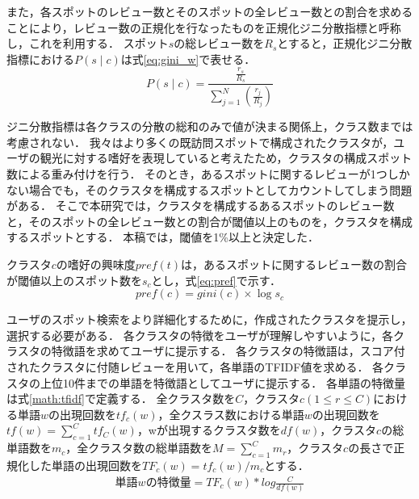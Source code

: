 \documentclass{deimj}
\begin{document}
また，各スポットのレビュー数とそのスポットの全レビュー数との割合を求めることにより，レビュー数の正規化を行なったものを正規化ジニ分散指標と呼称し，これを利用する．
スポット$s$の総レビュー数を$R_s$とすると，正規化ジニ分散指標における$P(s \mid c)$は式\ref{eq:gini_w}で表せる．
\begin{equation}
    P(s \mid c)=\frac {\frac{r_s}{R_s}}{\sum ^{N}_{j=1}\left( \frac {r_j}{R_j}\right)}
    \label{eq:gini_w}
\end{equation}

ジニ分散指標は各クラスの分散の総和のみで値が決まる関係上，クラス数までは考慮されない．
我々はより多くの既訪問スポットで構成されたクラスタが，ユーザの観光に対する嗜好を表現していると考えたため，クラスタの構成スポット数による重み付けを行う．
そのとき，あるスポットに関するレビューが1つしかない場合でも，そのクラスタを構成するスポットとしてカウントしてしまう問題がある．
そこで本研究では，クラスタを構成するあるスポットのレビュー数と，そのスポットの全レビュー数との割合が閾値以上のものを，クラスタを構成するスポットとする．
本稿では，閾値を1\%以上と決定した．

クラスタ$c$の嗜好の興味度$pref(t)$は，あるスポットに関するレビュー数の割合が閾値以上のスポット数を$s_c$とし，式\ref{eq:pref}で示す．
\begin{equation}
    pref(c)=gini(c) \times\log s_c
    \label{eq:pref}
\end{equation}

ユーザのスポット検索をより詳細化するために，作成されたクラスタを提示し，選択する必要がある．
各クラスタの特徴をユーザが理解しやすいように，各クラスタの特徴語を求めてユーザに提示する．
各クラスタの特徴語は，スコア付されたクラスタに付随レビューを用いて，各単語のTFIDF値を求める．
各クラスタの上位10件までの単語を特徴語としてユーザに提示する．
各単語の特徴量は式\ref{math:tfidf}で定義する．
全クラスタ数を$C$，クラスタ$c(1 \leq r \leq C)$における単語$w$の出現回数を$tf_{c}(w)$，全クスラス数における単語$w$の出現回数を$tf(w)=\sum_{c=1}^{C}tf_{C}(w)$，wが出現するクラスタ数を$df(w)$，クラスタ$c$の総単語数を$m_c$，全クラスタ数の総単語数を$M=\sum_{c=1}^{C}m_r$，クラスタ$c$の長さで正規化した単語の出現回数を$TF_c(w)=tf_c(w)/m_c$とする．
\begin{eqnarray}
単語wの特徴量 = TF_{c}(w) * log\frac{C}{df(w)}
    \label{math:tfidf}
\end{eqnarray}
\end{document}
